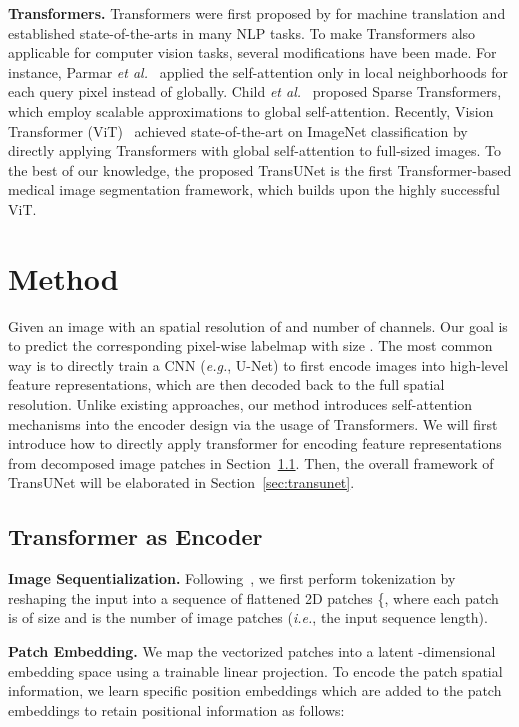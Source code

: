 \documentclass[runningheads]{llncs}
\begin{document}
\vspace{1ex}\noindent\textbf{Transformers.}
Transformers were first proposed by \cite{vaswani2017attention} for machine translation and established state-of-the-arts in many NLP tasks.
To make Transformers also applicable for computer vision tasks, several modifications have been made.
For instance, Parmar \emph{et al.}~\cite{parmar2018image} applied the self-attention only in local neighborhoods for each query pixel instead of globally.
Child \emph{et al.}~\cite{child2019generating} proposed Sparse Transformers, which employ scalable approximations to global self-attention.
Recently, Vision Transformer (ViT)~\cite{dosovitskiy2020image} achieved state-of-the-art on ImageNet classification by directly applying Transformers with global self-attention to full-sized images. 
To the best of our knowledge, the proposed TransUNet is the first Transformer-based medical image segmentation framework, which builds upon the highly successful ViT.


\section{Method}
Given an image  with an spatial resolution of  and  number of channels. Our goal is to predict the corresponding pixel-wise labelmap with size . The most common way is to directly train a CNN (\emph{e.g.}, U-Net) to first encode images into high-level feature representations, which are then decoded back to the full spatial resolution.
Unlike existing approaches, our method introduces self-attention mechanisms into the encoder design via the usage of Transformers.
We will first introduce how to directly apply transformer for encoding feature representations from decomposed image patches in Section~\ref{sec:transformer_encoder}.
Then, the overall framework of TransUNet will be elaborated in Section~\ref{sec:transunet}.

\subsection{Transformer as Encoder}
\label{sec:transformer_encoder}
\noindent\textbf{Image Sequentialization.} 
Following~\cite{dosovitskiy2020image}, we first perform tokenization by reshaping the input  into a sequence of flattened 2D patches \{, where each patch is of size  and  is the number of image patches (\emph{i.e.}, the input sequence length). 


\vspace{1ex}\noindent\textbf{Patch Embedding.} We map the vectorized patches  into a latent -dimensional embedding space using a trainable linear projection.
To encode the patch spatial information, we learn specific position embeddings which are added to the patch embeddings to retain positional information as follows:
\end{document}
